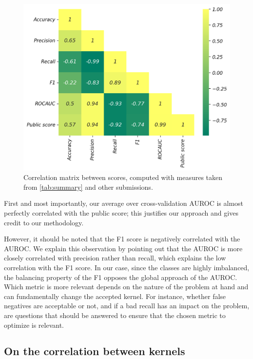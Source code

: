 \documentclass{IEEEtran}
\begin{document}
\begin{figure}[h]
    \centering
    \includegraphics[width=\linewidth]{correlation.png}
    \caption{Correlation matrix between scores, computed with measures taken from \ref{tab:summary} and other submissions.}
    \label{fig:corrmetrics}
\end{figure}

First and most importantly,
our average over cross-validation AUROC is almost perfectly correlated with the public score;
this justifies our approach and gives credit to our methodology.

However, it should be noted that the F1 score is negatively correlated with the AUROC.
We explain this observation by pointing out that the AUROC is more closely correlated with precision rather than recall,
which explains the low correlation with the F1 score.
In our case, since the classes are highly imbalanced,
the balancing property of the F1 opposes the global approach of the AUROC.
Which metric is more relevant depends on the nature of the
problem at hand and can fundamentally change the accepted kernel.
For instance, whether false negatives are acceptable or not, and if a bad recall has an impact on the problem,
are questions that should be answered to ensure that the chosen metric to optimize is relevant.


\subsection{On the correlation between kernels}
\end{document}
